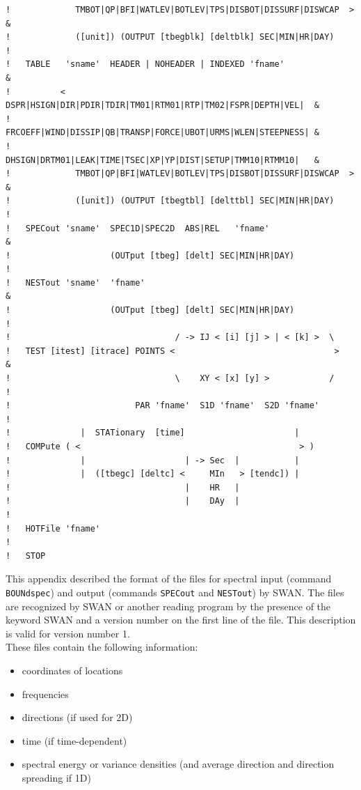 \documentclass[12pt]{book}
\begin{document}
\begin{verbatim}
!             TMBOT|QP|BFI|WATLEV|BOTLEV|TPS|DISBOT|DISSURF|DISWCAP  >      &
!             ([unit]) (OUTPUT [tbegblk] [deltblk] SEC|MIN|HR|DAY)
!
!   TABLE   'sname'  HEADER | NOHEADER | INDEXED 'fname'                    &
!          <  DSPR|HSIGN|DIR|PDIR|TDIR|TM01|RTM01|RTP|TM02|FSPR|DEPTH|VEL|  &
!             FRCOEFF|WIND|DISSIP|QB|TRANSP|FORCE|UBOT|URMS|WLEN|STEEPNESS| &
!             DHSIGN|DRTM01|LEAK|TIME|TSEC|XP|YP|DIST|SETUP|TMM10|RTMM10|   &
!             TMBOT|QP|BFI|WATLEV|BOTLEV|TPS|DISBOT|DISSURF|DISWCAP  >      &
!             ([unit]) (OUTPUT [tbegtbl] [delttbl] SEC|MIN|HR|DAY)
!
!   SPECout 'sname'  SPEC1D|SPEC2D  ABS|REL   'fname'                       &
!                    (OUTput [tbeg] [delt] SEC|MIN|HR|DAY)
!
!   NESTout 'sname'  'fname'                                                &
!                    (OUTput [tbeg] [delt] SEC|MIN|HR|DAY)
!
!                                 / -> IJ < [i] [j] > | < [k] >  \
!   TEST [itest] [itrace] POINTS <                                >         &
!                                 \    XY < [x] [y] >            /
!
!                         PAR 'fname'  S1D 'fname'  S2D 'fname'
!
!              |  STATionary  [time]                      |
!   COMPute ( <                                            > )
!              |                    | -> Sec  |           |
!              |  ([tbegc] [deltc] <     MIn   > [tendc]) |
!                                   |    HR   |
!                                   |    DAy  |
!
!   HOTFile 'fname'
!
!   STOP
\end{verbatim}

 \label{app:spcform}

This appendix described the format of the files for spectral input (command {\tt BOUNdspec}) and output
(commands {\tt SPECout} and {\tt NESTout}) by SWAN. The files are recognized by SWAN or another reading program
by the presence of the keyword SWAN and a version number on the first line of the file. This description
is valid for version number 1.
\\[2ex]
\noindent
These files contain the following information:
\begin{itemize}
  \item coordinates of locations
  \item frequencies
  \item directions (if used for 2D)
  \item time (if time-dependent)
  \item spectral energy or variance densities (and average direction and direction spreading if 1D)
\end{itemize}
\end{document}
